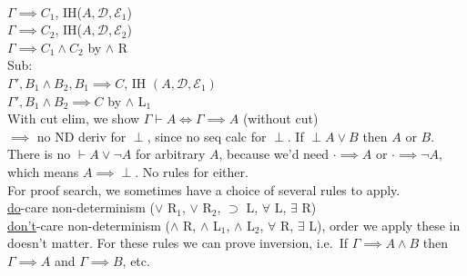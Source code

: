 \\ $\Gamma \implies C_1$, IH($A, \mathcal{D}, \mathcal{E}_1$)
\\ $\Gamma \implies C_2$, IH($A, \mathcal{D}, \mathcal{E}_2$)
\\ $\Gamma \implies C_1 \land C_2$ by $\land$ R
\\ Sub: 
\\ $\Gamma', B_1 \land B_2, B_1 \implies C$, IH $(A, \mathcal{D},
\mathcal{E}_1)$
\\ $\Gamma', B_1 \land B_2 \implies C$ by $\land$ L$_1$
\\ With cut elim, we show $\Gamma \vdash A \iff \Gamma \implies A$
(without cut)
\\ $\implies$ no ND deriv for $\perp$, since no seq calc for
$\perp$. If $\perp A \lor B$ then $A$ or $B$. There is no $\vdash A
\lor \neg A$ for arbitrary $A$, because we'd need $\cdot \implies A$
or $\cdot \implies \neg A$, which means $A \implies \perp$. No rules
for either.
\\ For proof search, we sometimes have a choice of several rules to
apply.
\\\underline{do}-care non-determinism ($\lor$ R$_1$, $\lor$
R$_2$, $\supset$ L, $\forall$ L, $\exists$ R)
\\\underline{don't}-care non-determinism ($\land $ R, $\land$
L$_1$, $\land$ L$_2$, $\forall$ R, $\exists$ L), order we apply these
in doesn't matter. For these rules we can prove inversion, i.e.\ If
$\Gamma \implies A \land B$ then $\Gamma \implies A$ and $\Gamma
\implies B$, etc.
\color{Green}
